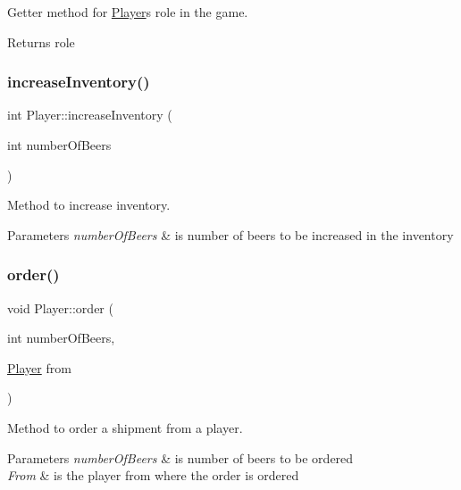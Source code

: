 Getter method for \hyperlink{class_player}{Player}\textquotesingle{}s role in the game. 

\begin{DoxyReturn}{Returns}
role 
\end{DoxyReturn}
\mbox{\label{class_player_af67e6ee0de38f3e9635d35849f103449}} 
\subsubsection{\texorpdfstring{increase\+Inventory()}{increaseInventory()}}
{\footnotesize\ttfamily int Player\+::increase\+Inventory (\begin{DoxyParamCaption}\item[{int}]{number\+Of\+Beers }\end{DoxyParamCaption})}



Method to increase inventory. 


\begin{DoxyParams}{Parameters}
{\em number\+Of\+Beers} & is number of beers to be increased in the inventory \\
\hline
\end{DoxyParams}
\mbox{\label{class_player_a473d9c248207e213abc5575859a51c1b}} 
\subsubsection{\texorpdfstring{order()}{order()}}
{\footnotesize\ttfamily void Player\+::order (\begin{DoxyParamCaption}\item[{int}]{number\+Of\+Beers,  }\item[{\hyperlink{class_player}{Player}}]{from }\end{DoxyParamCaption})}



Method to order a shipment from a player. 


\begin{DoxyParams}{Parameters}
{\em number\+Of\+Beers} & is number of beers to be ordered \\
\hline
{\em From} & is the player from where the order is ordered \\
\hline
\end{DoxyParams}
\mbox{\label{class_player_afd48e4062a9411e1f66cf23809b8c43f}} 
